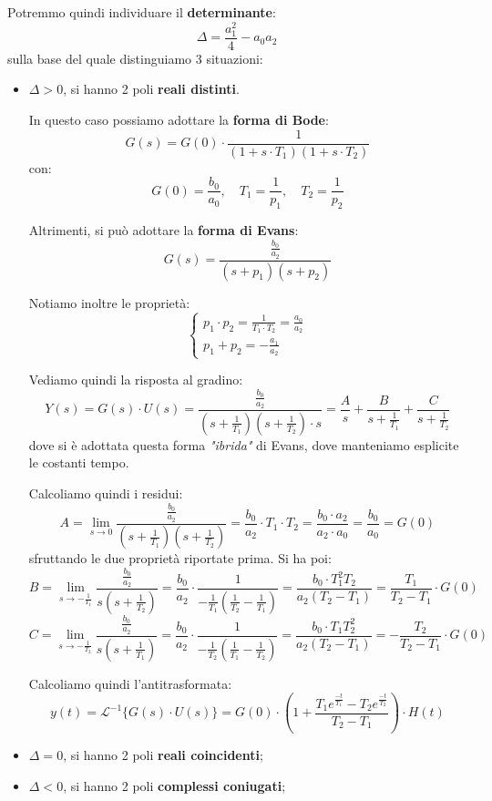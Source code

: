 \documentclass[a4paper,11pt]{article}
\begin{document}
Potremmo quindi individuare il \textbf{determinante}:
$$
\Delta = \frac{a_1^2}{4} - a_0a_2
$$
sulla base del quale distinguiamo 3 situazioni:
\begin{itemize}
	\item $\Delta > 0$, si hanno 2 poli \textbf{reali distinti}.

		In questo caso possiamo adottare la \textbf{forma di Bode}:
		$$
		G(s) = G(0) \cdot \frac{1}{(1 + s \cdot T_1)(1 + s \cdot T_2)}
		$$
		con:
		$$
		G(0) = \frac{b_0}{a_0}, \quad T_1 = \frac{1}{p_1}, \quad T_2 = \frac{1}{p_2}
		$$

		Altrimenti, si può adottare la \textbf{forma di Evans}:
		$$
		G(s) = \frac{\frac{b_0}{a_2}}{(s + p_1)(s + p_2)}
		$$

		Notiamo inoltre le proprietà:
		\[
			\begin{cases}
		p_1 \cdot p_2 = \frac{1}{T_1 \cdot T_2} = \frac{a_0}{a_2} \\
		p_1 + p_2 = -\frac{a_1}{a_2}
			\end{cases}
		\]

		Vediamo quindi la risposta al gradino:
		$$
		Y(s) = G(s) \cdot U(s) = \frac{\frac{b_0}{a_2}}{(s + \frac{1}{T_1})(s + \frac{1}{T_2}) \cdot s} = \frac{A}{s} + \frac{B}{s + \frac{1}{T_1}} + \frac{C}{s + \frac{1}{T_2}}
		$$
		dove si è adottata questa forma \textit{"ibrida"} di Evans, dove manteniamo esplicite le costanti tempo.

	Calcoliamo quindi i residui:
	$$
	A = \lim_{s \rightarrow 0} \frac{\frac{b_0}{a_2}}{(s + \frac{1}{T_1})(s + \frac{1}{T_2})} = \frac{b_0}{a_2} \cdot T_1 \cdot T_2 = \frac{b_0 \cdot a_2}{a_2 \cdot a_0} = \frac{b_0}{a_0} = G(0)
	$$
	sfruttando le due proprietà riportate prima.
	Si ha poi:
	$$
	B = \lim_{s \rightarrow - \frac{1}{T_1}} \frac{\frac{b_0}{a_2}}{s (s + \frac{1}{T_2})} 
	= \frac{b_0}{a_2} \cdot \frac{1}{-\frac{1}{T_1} (\frac{1}{T_2} - \frac{1}{T_1})} 
	= \frac{b_0 \cdot T_1^2 T_2}{a_2 (T_2 - T_1)} 
	= \frac{T_1}{T_2 - T_1} \cdot G(0)
	$$
	$$
	C = \lim_{s \rightarrow - \frac{1}{T_2}} \frac{\frac{b_0}{a_2}}{s (s + \frac{1}{T_1})} 
	= \frac{b_0}{a_2} \cdot \frac{1}{-\frac{1}{T_2} (\frac{1}{T_1} - \frac{1}{T_2})} 
	= \frac{b_0 \cdot T_1 T_2^2}{a_2 (T_2 - T_1)} 
	= -\frac{T_2}{T_2 - T_1} \cdot G(0)
	$$

	Calcoliamo quindi l'antitrasformata:
	$$
	y(t) = \mathcal{L}^{-1} \{ G(s) \cdot U(s) \} = G(0) \cdot \left( 1 + \frac{T_1 e^{\frac{-t}{T_1}} - T_2 e^{\frac{-t}{T_2}}}{T_2 - T_1} \right) \cdot H(t)
	$$

	\item $\Delta = 0$, si hanno 2 poli \textbf{reali coincidenti};
	\item $\Delta < 0$, si hanno 2 poli \textbf{complessi coniugati};
\end{itemize}
\end{document}
